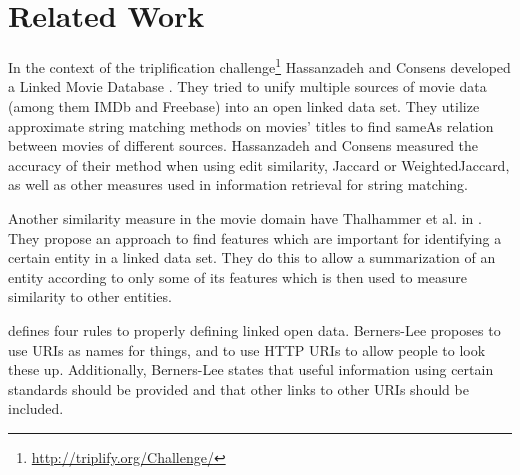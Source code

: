 \section{Related Work}
\label{sec_related_work}

In the context of the triplification challenge\footnote{\url{http://triplify.org/Challenge/}} Hassanzadeh and Consens developed a Linked Movie Database \cite{LMDB}.
They tried to unify multiple sources of movie data (among them IMDb and Freebase) into an open linked data set.
They utilize approximate string matching methods on movies' titles to find sameAs relation between movies of different sources.
Hassanzadeh and Consens measured the accuracy of their method when using edit similarity, Jaccard or WeightedJaccard, as well as other measures used in information retrieval for string matching.

Another similarity measure in the movie domain have Thalhammer et al. in \cite{MovieSummarization}.
They propose an approach to find features which are important for identifying a certain entity in a linked data set.
They do this to allow a summarization of an entity according to only some of its features which is then used to measure similarity to other entities.

\cite{linkedData_DesignIssues} defines four rules to properly defining linked open data.
Berners-Lee proposes to use URIs as names for things, and to use HTTP URIs to allow people to look these up.
Additionally, Berners-Lee states that useful information using certain standards should be provided and that other links to other URIs should be included.











